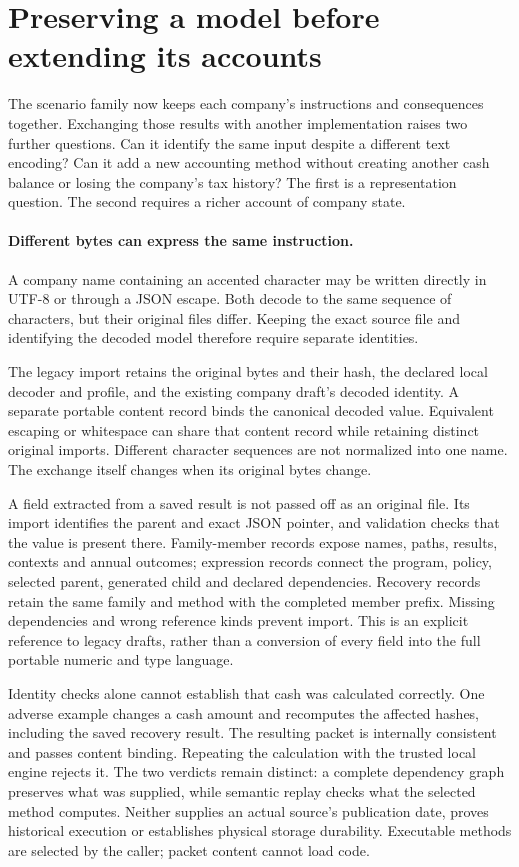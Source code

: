 \section{Preserving a model before extending its accounts}
\label{sec:company-module-language}

The scenario family now keeps each company's instructions and consequences
together. Exchanging those results with another implementation raises two
further questions. Can it identify the same input despite a different text
encoding? Can it add a new accounting method without creating another cash
balance or losing the company's tax history? The first is a representation
question. The second requires a richer account of company state.

\paragraph{Different bytes can express the same instruction.}
A company name containing an accented character may be written directly in
UTF-8 or through a JSON escape. Both decode to the same sequence of characters,
but their original files differ. Keeping the exact source file and identifying
the decoded model therefore require separate identities.

The legacy import retains the original bytes and their hash, the declared local
decoder and profile, and the existing company draft's decoded identity. A
separate portable content record binds the canonical decoded value. Equivalent
escaping or whitespace can share that content record while retaining distinct
original imports. Different character sequences are not normalized into one
name. The exchange itself changes when its original bytes change.

A field extracted from a saved result is not passed off as an original file.
Its import identifies the parent and exact JSON pointer, and validation checks
that the value is present there. Family-member records expose names, paths,
results, contexts and annual outcomes; expression records connect the program,
policy, selected parent, generated child and declared dependencies. Recovery
records retain the same family and method with the completed member prefix.
Missing dependencies and wrong reference kinds prevent import. This is an
explicit reference to legacy drafts, rather than a conversion of every field
into the full portable numeric and type language.

Identity checks alone cannot establish that cash was calculated correctly.
One adverse example changes a cash amount and recomputes the affected hashes,
including the saved recovery result. The resulting packet is internally
consistent and passes content binding. Repeating the calculation with the
trusted local engine rejects it. The two verdicts remain distinct: a complete
dependency graph preserves what was supplied, while semantic replay checks
what the selected method computes. Neither supplies an actual source's
publication date, proves historical execution or establishes physical storage
durability. Executable methods are selected by the caller; packet content
cannot load code.

